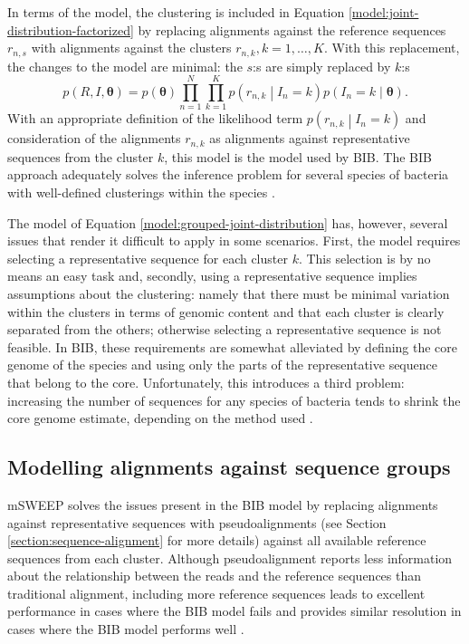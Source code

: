 \documentclass[officiallayout]{tktla}
\begin{document}
In terms of the model, the clustering is included in Equation
\ref{model:joint-distribution-factorized} by replacing alignments
against the reference sequences $r_{n, s}$ with alignments against the
clusters $r_{n, k}, k = 1, \dots, K$. With this replacement, the
changes to the model are minimal: the $s$:s are simply replaced by
$k$:s
\begin{equation}
  \label{model:grouped-joint-distribution}
  p\left(R, I, \boldsymbol\theta\right) = p\left(\boldsymbol\theta\right)\prod_{n = 1}^{N} \prod_{k = 1}^{K} p\left(r_{n, k} \middle| I_{n} = k\right) p\left(I_{n} = k \middle| \boldsymbol\theta\right).
\end{equation}
With an appropriate definition of the likelihood term $p\left(r_{n, k}
\middle| I_{n} = k\right)$ and consideration of the alignments $r_{n,
  k}$ as alignments against representative sequences from the cluster
$k$, this model is the model used by BIB. The BIB approach adequately
solves the inference problem for several species of bacteria with
well-defined clusterings within the species
\citep{sankar2016bayesian}.

The model of Equation \ref{model:grouped-joint-distribution} has,
however, several issues that render it difficult to apply in some
scenarios. First, the model requires selecting a representative
sequence for each cluster $k$. This selection is by no means an easy
task and, secondly, using a representative sequence implies
assumptions about the clustering: namely that there must be minimal
variation within the clusters in terms of genomic content and that
each cluster is clearly separated from the others; otherwise selecting
a representative sequence is not feasible. In BIB, these requirements
are somewhat alleviated by defining the core genome of the species and
using only the parts of the representative sequence that belong to the
core. Unfortunately, this introduces a third problem: increasing the
number of sequences for any species of bacteria tends to shrink the
core genome estimate, depending on the method used
\citep{tonkin2020producing}.

\subsection{Modelling alignments against sequence groups}

mSWEEP solves the issues present in the BIB model by replacing
alignments against representative sequences with pseudoalignments (see
Section \ref{section:sequence-alignment} for more details) against all
available reference sequences from each cluster. Although
pseudoalignment reports less information about the relationship
between the reads and the reference sequences than traditional
alignment, including more reference sequences leads to excellent
performance in cases where the BIB model fails and provides similar
resolution in cases where the BIB model performs well
\citep{maklin_high-resolution_2021}.
\end{document}
